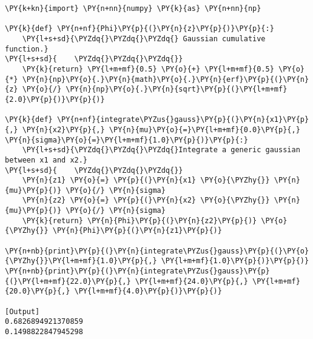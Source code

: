 \begin{Verbatim}[label=\makebox{\href{https://bitbucket.org/lbaldini/statnotes/src/master/snippets/erf.py}{https://bitbucket.org/.../erf.py}},commandchars=\\\{\}]
\PY{k+kn}{import} \PY{n+nn}{numpy} \PY{k}{as} \PY{n+nn}{np}

\PY{k}{def} \PY{n+nf}{Phi}\PY{p}{(}\PY{n}{z}\PY{p}{)}\PY{p}{:}
    \PY{l+s+sd}{\PYZdq{}\PYZdq{}\PYZdq{} Gaussian cumulative function.}
\PY{l+s+sd}{    \PYZdq{}\PYZdq{}\PYZdq{}}
    \PY{k}{return} \PY{l+m+mf}{0.5} \PY{o}{+} \PY{l+m+mf}{0.5} \PY{o}{*} \PY{n}{np}\PY{o}{.}\PY{n}{math}\PY{o}{.}\PY{n}{erf}\PY{p}{(}\PY{n}{z} \PY{o}{/} \PY{n}{np}\PY{o}{.}\PY{n}{sqrt}\PY{p}{(}\PY{l+m+mf}{2.0}\PY{p}{)}\PY{p}{)}

\PY{k}{def} \PY{n+nf}{integrate\PYZus{}gauss}\PY{p}{(}\PY{n}{x1}\PY{p}{,} \PY{n}{x2}\PY{p}{,} \PY{n}{mu}\PY{o}{=}\PY{l+m+mf}{0.0}\PY{p}{,} \PY{n}{sigma}\PY{o}{=}\PY{l+m+mf}{1.0}\PY{p}{)}\PY{p}{:}
    \PY{l+s+sd}{\PYZdq{}\PYZdq{}\PYZdq{}Integrate a generic gaussian between x1 and x2.}
\PY{l+s+sd}{    \PYZdq{}\PYZdq{}\PYZdq{}}
    \PY{n}{z1} \PY{o}{=} \PY{p}{(}\PY{n}{x1} \PY{o}{\PYZhy{}} \PY{n}{mu}\PY{p}{)} \PY{o}{/} \PY{n}{sigma}
    \PY{n}{z2} \PY{o}{=} \PY{p}{(}\PY{n}{x2} \PY{o}{\PYZhy{}} \PY{n}{mu}\PY{p}{)} \PY{o}{/} \PY{n}{sigma}
    \PY{k}{return} \PY{n}{Phi}\PY{p}{(}\PY{n}{z2}\PY{p}{)} \PY{o}{\PYZhy{}} \PY{n}{Phi}\PY{p}{(}\PY{n}{z1}\PY{p}{)}

\PY{n+nb}{print}\PY{p}{(}\PY{n}{integrate\PYZus{}gauss}\PY{p}{(}\PY{o}{\PYZhy{}}\PY{l+m+mf}{1.0}\PY{p}{,} \PY{l+m+mf}{1.0}\PY{p}{)}\PY{p}{)}
\PY{n+nb}{print}\PY{p}{(}\PY{n}{integrate\PYZus{}gauss}\PY{p}{(}\PY{l+m+mf}{22.0}\PY{p}{,} \PY{l+m+mf}{24.0}\PY{p}{,} \PY{l+m+mf}{20.0}\PY{p}{,} \PY{l+m+mf}{4.0}\PY{p}{)}\PY{p}{)}

[Output]
0.6826894921370859
0.1498822847945298
\end{Verbatim}